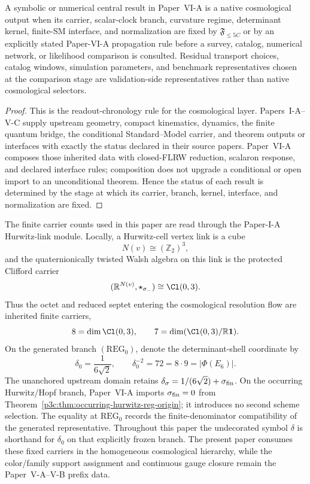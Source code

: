 \documentclass[12pt,a4paper]{article}
\begin{document}
\begin{theorem}
\label{p8:thm:cosmological-realization-criterion}
A symbolic or numerical central result in Paper~VI-A is a native cosmological output when its carrier, scalar-clock branch, curvature regime, determinant kernel, finite-SM interface, and normalization are fixed by \(\mathfrak F_{\le5C}\) or by an explicitly stated Paper-VI-A propagation rule before a survey, catalog, numerical network, or likelihood comparison is consulted.  Residual transport choices, catalog windows, simulation parameters, and benchmark representatives chosen at the comparison stage are validation-side representatives rather than native cosmological selectors.
\end{theorem}

\begin{proof}
This is the readout-chronology rule for the cosmological layer.  Papers~I-A--V-C
supply upstream geometry, compact kinematics, dynamics, the finite quantum
bridge, the conditional Standard--Model carrier, and theorem outputs or
interfaces with exactly the status declared in their source papers.  Paper~VI-A
composes those inherited data with closed-FLRW reduction, scalaron response,
and declared interface rules; composition does not upgrade a conditional or
open import to an unconditional theorem.  Hence the status of each result is
determined by the stage at which its carrier, branch, kernel, interface, and
normalization are fixed.
\end{proof}

\begin{remark}
\label{p8:rem:hurwitz-link-cosmology-scope}
The finite carrier counts used in this paper are read through the Paper-I-A Hurwitz-link module.  Locally, a Hurwitz-cell vertex link is a cube
\[
N(v)\cong(\mathbb Z_2)^3,
\]
and the quaternionically twisted Walsh algebra on this link is the protected Clifford carrier
\[
(\mathbb R^{N(v)},\star_{\sigma_-})\cong\Cl(0,3).
\]
Thus the octet and reduced septet entering the cosmological resolution flow are inherited finite carriers,
\[
8=\dim\Cl(0,3),\qquad 7=\dim(\Cl(0,3)/\mathbb R\mathbf 1).
\]
On the generated branch \((\mathrm{REG}_0)\), denote the determinant-shell coordinate by
\[
\delta_0=\frac1{6\sqrt2},
\qquad
\delta_0^{-2}=72=8\cdot9=|\Phi(E_6)|.
\]
The unanchored upstream domain retains \(\delta_\sigma=1/(6\sqrt2)+\sigma_{\rm fin}\). On the occurring Hurwitz/Hopf branch, Paper~VI-A imports \(\sigma_{\rm fin}=0\) from Theorem~\ref{p3c:thm:occurring-hurwitz-reg-origin}; it introduces no second scheme selection.  The equality at \(\mathrm{REG}_0\) records the finite-denominator compatibility of the generated representative.  Throughout this paper the undecorated symbol \(\delta\) is shorthand for \(\delta_0\) on that explicitly frozen branch.  The present paper consumes these fixed carriers in the homogeneous cosmological hierarchy, while the color/family support assignment and continuous gauge closure remain the Paper~V-A--V-B prefix data.
\end{remark}
\end{document}
